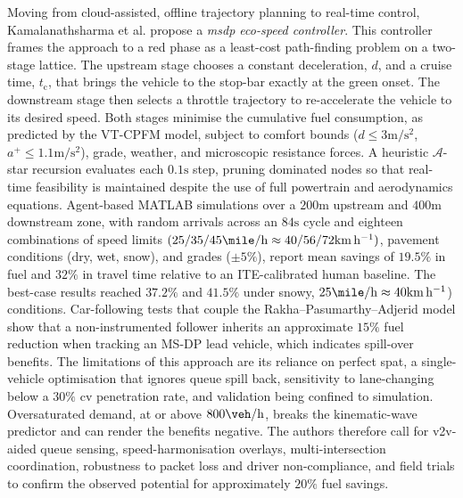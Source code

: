 Moving from cloud-assisted, offline trajectory planning to real-time control, Kamalanathsharma et al. \cite{Kamalanathsharma2013} propose a \textit{\ac{msdp} eco-speed controller}. This controller frames the approach to a red phase as a least-cost path-finding problem on a two-stage lattice. The upstream stage chooses a constant deceleration, $d$, and a cruise time, $t_{\mathrm c}$, that brings the vehicle to the stop-bar exactly at the green onset. The downstream stage then selects a throttle trajectory to re-accelerate the vehicle to its desired speed. Both stages minimise the cumulative fuel consumption, as predicted by the VT-CPFM model, subject to comfort bounds ($d\le3\unit{\metre\per \second\squared}$, $a^{+}\le1.1\unit{\metre\per\second\squared}$), grade, weather, and microscopic resistance forces. A heuristic $\mathcal{A}$-star recursion evaluates each $0.1\unit{\second}$ step, pruning dominated nodes so that real-time feasibility is maintained despite the use of full powertrain and aerodynamics equations.
Agent-based MATLAB simulations over a $200\unit{\metre}$ upstream and $400\unit{\metre}$ downstream zone, with random arrivals across an $84\unit{\second}$ cycle and eighteen combinations of speed limits $(25/35/45\unit{\mile\per\hour} \approx 40/56/72\unit{\kilo\metre\per\hour})$, pavement conditions (dry, wet, snow), and grades ($\pm5\%$), report mean savings of $19.5\%$ in fuel and $32\%$ in travel time relative to an ITE-calibrated human baseline. The best-case results reached $37.2\%$ and $41.5\%$ under snowy, $25\unit{\mile\per\hour} \approx 40\unit{\kilo\metre\per\hour}$) conditions. Car-following tests that couple the Rakha–Pasumarthy–Adjerid model show that a non-instrumented follower inherits an approximate $15\%$ fuel reduction when tracking an MS-DP lead vehicle, which indicates spill-over benefits. The limitations of this approach are its reliance on perfect \ac{spat}, a single-vehicle optimisation that ignores queue spill back, sensitivity to lane-changing below a $30\%$ \ac{cv} penetration rate, and validation being confined to simulation. Oversaturated demand, at or above $800\unit{\veh\per\hour}$, breaks the kinematic-wave predictor and can render the benefits negative. The authors therefore call for \ac{v2v}-aided queue sensing, speed-harmonisation overlays, multi-intersection coordination, robustness to packet loss and driver non-compliance, and field trials to confirm the observed potential for approximately $20\%$ fuel savings.
\mynewline
